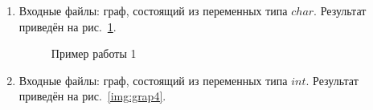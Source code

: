 \documentclass[12pt, a4paper]{article}
\begin{document}
\begin{enumerate}
	\item Входные файлы: граф, состоящий из переменных типа $char$.
	Результат приведён на рис.~\ref{img:grap3}.
	\begin{figure}[h]
  		\caption{Пример работы 1}
  		\label{img:grap3}
	\end{figure}
	\newpage
	\item Входные файлы: граф, состоящий из переменных типа $int$.
	Результат приведён на рис.~\ref{img:grap4}.
	\begin{figure}[h]

\end{figure}
\end{enumerate}
\end{document}

